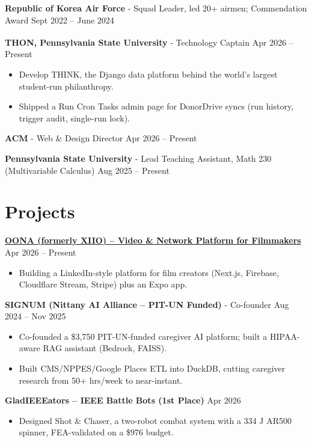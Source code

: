 \documentclass[11pt,a4paper]{article}
\newcommand{\blockspace}{\vspace{0.12em}}
\newenvironment{details}{\begin{itemize}[leftmargin=1.4em, label=\textbullet, topsep=0pt, itemsep=0pt, parsep=0pt, partopsep=0pt]}{\end{itemize}}
\begin{document}
\noindent\textbf{Republic of Korea Air Force} - Squad Leader, led 20+ airmen; Commendation Award \hfill Sept 2022 -- June 2024\par
\blockspace

\noindent\textbf{THON\textsuperscript{\texttrademark}, Pennsylvania State University} - Technology Captain \hfill Apr 2026 -- Present
\begin{details}
\item Develop THINK, the Django data platform behind the world's largest student-run philanthropy.
\item Shipped a Run Cron Tasks admin page for DonorDrive syncs (run history, trigger audit, single-run lock).
\end{details}
\blockspace

\noindent\textbf{ACM} - Web \& Design Director \hfill Apr 2026 -- Present\par
\blockspace

\noindent\textbf{Pennsylvania State University} - Lead Teaching Assistant, Math 230 (Multivariable Calculus) \hfill Aug 2025 -- Present

\section{Projects}
\noindent\textbf{\href{https://xiio.vercel.app}{OONA (formerly XIIO) – Video \& Network Platform for Filmmakers}} \hfill Apr 2026 -- Present
\begin{details}
\item Building a LinkedIn-style platform for film creators (Next.js, Firebase, Cloudflare Stream, Stripe) plus an Expo app.
\end{details}
\blockspace

\noindent\textbf{SIGNUM (Nittany AI Alliance – PIT-UN Funded)} - Co-founder \hfill Aug 2024 -- Nov 2025
\begin{details}
\item Co-founded a \$3,750 PIT-UN-funded caregiver AI platform; built a HIPAA-aware RAG assistant (Bedrock, FAISS).
\item Built CMS/NPPES/Google Places ETL into DuckDB, cutting caregiver research from 50+ hrs/week to near-instant.
\end{details}
\blockspace

\noindent\textbf{GladIEEEators – IEEE Battle Bots (1st Place)} \hfill Apr 2026
\begin{details}
\item Designed Shot \& Chaser, a two-robot combat system with a 334 J AR500 spinner, FEA-validated on a \$976 budget.
\end{details}
\end{document}
